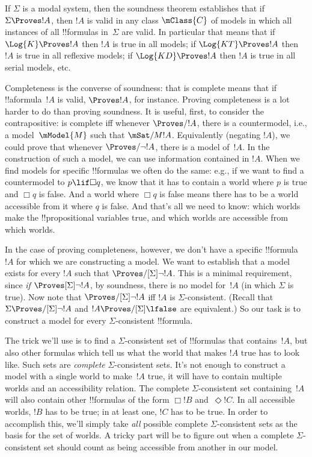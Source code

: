 \documentclass[../../../include/open-logic-section]{subfiles}
\begin{document}

If $\Sigma$ is a modal system, then the soundness theorem establishes
that if $\Sigma \Proves !A$, then $!A$ is valid in any class
$\mClass{C}$ of models in which all instances of all !!{formula}s
in~$\Sigma$ are valid. In particular that means that if $\Log{K}
\Proves !A$ then $!A$ is true in all models; if $\Log{KT} \Proves !A$
then $!A$ is true in all reflexive models; if $\Log{KD} \Proves !A$
then $!A$ is true in all serial models, etc.

Completeness is the converse of soundness: that  is complete
means that if !!a{formula}~$!A$ is valid, $\Proves !A$, for instance.
Proving completeness is a lot harder to do than proving soundness.  It
is useful, first, to consider the contrapositive:  is complete
iff whenever $\Proves/ !A$, there is a countermodel, i.e., a
model~$\mModel{M}$ such that $\mSat/{M}{!A}$. Equivalently (negating
$!A$), we could prove that whenever $\Proves/ \lnot !A$, there is a
model of~$!A$.  In the construction of such a model, we can use
information contained in $!A$.  When we find models for specific
!!{formula}s we often do the same: e.g., if we want to find a
countermodel to $p \lif \Box q$, we know that it has to contain a
world where $p$ is true and $\Box q$ is false. And a world where $\Box
q$ is false means there has to be a world accessible from it where $q$
is false. And that's all we need to know: which worlds make the
!!{propositional variable}s true, and which worlds are accessible from
which worlds.

In the case of proving completeness, however, we don't have a specific
!!{formula}~$!A$ for which we are constructing a model. We want to
establish that a model exists for every $!A$ such that
$\Proves/[\Sigma] \lnot !A$. This is a minimal requirement, since
\emph{if} $\Proves[\Sigma] \lnot !A$, by soundness, there is no model
for~$!A$ (in which $\Sigma$ is true).  Now note that $\Proves/[\Sigma]
\lnot !A$ iff $!A$ is $\Sigma$-consistent.  (Recall that $\Sigma
\Proves/[\Sigma] \lnot !A$ and $!A \Proves/[\Sigma] \lfalse$ are
equivalent.)  So our task is to construct a model for every
$\Sigma$-consistent !!{formula}.

The trick we'll use is to find a $\Sigma$-consistent set of
!!{formula}s that contains~$!A$, but also other formulas which tell us
what the world that makes $!A$ true has to look like. Such sets are
\emph{complete} $\Sigma$-consistent sets. It's not enough to
construct a model with a single world to make~$!A$ true, it will have
to contain multiple worlds and an accessibility relation. The complete
$\Sigma$-consistent set containing~$!A$ will also contain other
!!{formula}s of the form $\Box !B$ and~$\Diamond !C$. In all
accessible worlds, $!B$ has to be true; in at least one, $!C$ has to
be true. In order to accomplish this, we'll simply take \emph{all}
possible complete $\Sigma$-consistent sets as the basis for the set of
worlds. A tricky part will be to figure out when a complete
$\Sigma$-consistent set should count as being accessible from another
in our model.
\end{document}
